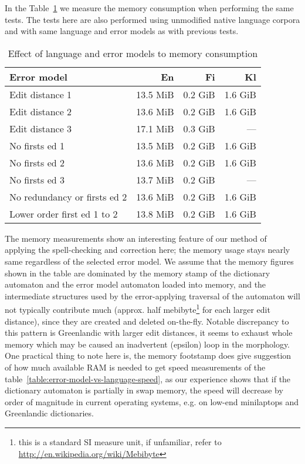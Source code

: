 \documentclass[11pt]{article}
\begin{document}
In the Table~\ref{table:error-model-vs-language-memory} we measure the memory
consumption when performing the same tests. The tests here are also performed
using unmodified native language corpora and with same language and error
models as with previous tests.

\begin{table}[h]
\begin{center}
\begin{scriptsize}
\begin{tabular}{|l|rrr|}
\hline
\bf Error model & \bf En & \bf Fi & \bf Kl \\ 
\hline
Edit distance 1 &
13.5 MiB&0.2 GiB&1.6 GiB
\\
Edit distance 2 &
13.6 MiB&0.2 GiB&1.6 GiB
\\
Edit distance 3 &
17.1 MiB&0.3 GiB&---
\\
No firsts ed 1 & 
13.5 MiB&0.2 GiB&1.6 GiB
\\
No firsts ed 2 &
13.6 MiB&0.2 GiB&1.6 GiB
\\
No firsts ed 3 &
13.7 MiB&0.2 GiB&---
\\
No redundancy or firsts ed 2 &
13.6 MiB&0.2 GiB&1.6 GiB
\\
Lower order first ed 1 to 2 &
13.8 MiB&0.2 GiB&1.6 GiB
\\
\hline
\end{tabular}
\end{scriptsize}
\end{center}
\caption{\label{table:error-model-vs-language-memory} Effect of language and 
error models to memory consumption}
\end{table}

The memory measurements show an interesting feature of our method of applying
the spell-checking and correction here; the memory usage stays nearly same
regardless of the selected error model. We assume that the memory figures shown
in the table are dominated by the memory stamp of the dictionary automaton and
the error model automaton loaded into memory, and the intermediate structures
used by the error-applying traversal of the automaton will not typically
contribute much (approx. half mebibyte\footnote{this is a standard SI measure
unit, if unfamiliar, refer to \url{http://en.wikipedia.org/wiki/Mebibyte}} for
each larger edit distance), since they are created and deleted on-the-fly.
Notable discrepancy to this pattern is Greenlandic with larger edit distances,
it seems to exhaust whole memory which may be caused an inadvertent (epsilon)
loop in the morphology. One practical thing to note here is, the memory
footstamp does give suggestion of how much available RAM is needed to get speed
measurements of the table~\ref{table:error-model-vs-language-speed}, as our
experience shows that if the dictionary automaton is partially in swap memory,
the speed will decrease by order of magnitude in current operating systems,
e.g. on low-end minilaptops and Greenlandic dictionaries.
\end{document}
